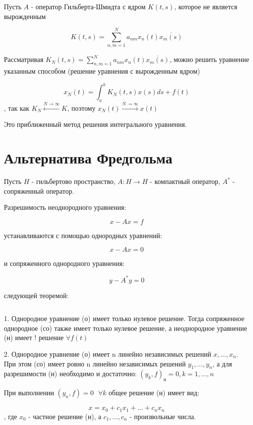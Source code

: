 \documentclass[12pt, a4paper]{report}
\begin{document}
\begin{theorem}  

    Пусть \( A  \) - оператор Гильберта-Шмидта с ядром \( K ( t, s ) \), которое не является вырожденным 

    \[ K (t, s ) = \sum_{n,m =1}^N a_{n m  } x_n (t ) \overline{x_m (s )}  \]  

    Рассматривая \( K_N (t,s ) = \displaystyle  \sum_{n , m =1} ^N a_{ nm }  x_n (t ) \overline{x_m (s)}   \), можно решить уравнение указанным способом (решение уравнения с вырожденным ядром)

    \[ x_N (t ) = \int_{a }^{ b }  K_N (t, s ) x(s ) ds +f(t )  \]  
    , так как \( K_N \xleftarrow{ N \to  \infty  } K    \), поэтому \( x_{N } (t ) \xrightarrow{ N \to  \infty  } x(t )   \) 
    
    Это приближенный метод решения интегрального уравнения.

\end{theorem}

\section{Альтернатива Фредгольма}

Пусть \( H \) - гильбертово пространство, \( A : H \to  H  \) - компактный оператор, \( A^*  \) - сопряженный оператор. 

Разрешимость неоднородного уравнения: 

\[  x - Ax = f \tag{н} \] 

устанавливаются с помощью однородных уравнений: 

\[ x - A x = 0 \tag{о} \] 

и сопряженного однородного уравнения: 

\[ y - A ^* y = 0 \tag{со} \] 

следующей теоремой: 

\begin{theorem} \(  \) 

    1. Однородное уравнение (о) имеет только нулевое решение. Тогда  сопряженное однородное (со) также имеет  только нулевое решение, а неоднородное уравнение (н) имеет ! решение \( \forall  f(t) \) 

    2. Однородное уравнение (о) имеет n линейно независимых решений \( x, \ldots, x_n \). При этом (со) имеет ровно n линейно независимых решений \( y_1 ,..., y_n \), а для разрешимости (н) необходимо и достаточно: \( (y_k ,f ) _{\text{н} }  = 0 , k = 1, \ldots, n\) 

    При выполнении \( (y_n ,f ) = 0 \text{ }  \forall  k  \) общее решение (н) имеет вид: 

    \[ x = x_0 + c_1 x_1 +... + c_n x_n \] 
    , где \( x_0  \)  - частное решение (н), а \( c_1, \ldots, c_n \) - произвольные числа. 

\end{theorem}
\end{document}
